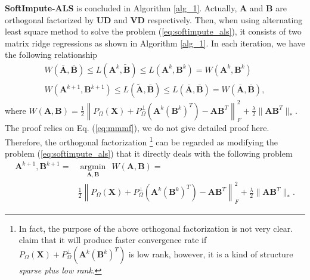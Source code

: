 \documentclass[11pt]{article}
\begin{document}
\textbf{SoftImpute-ALS} is concluded in Algorithm \ref{alg_1}. Actually,  $\boldsymbol{A}$ and $\boldsymbol{B}$ are orthogonal factorized by $\boldsymbol{U}\boldsymbol{D}$ and $\boldsymbol{V}\boldsymbol{D}$ respectively. Then, when using  alternating least square method to solve the problem (\ref{eq:softimpute_als}), it consists of two matrix ridge regressions as shown in Algorithm \ref{alg_1}. In each iteration, we have the following relationship
\begin{equation}
	\begin{split}
	W(\bar{\boldsymbol{A}},\bar{\boldsymbol{B}})\leq L(\boldsymbol{A}^k,\tilde{\boldsymbol{B}}) \leq L(\boldsymbol{A}^k,\boldsymbol{B}^k)=W(\boldsymbol{A}^k,\boldsymbol{B}^k) \\
	W(\boldsymbol{A}^{k+1},\boldsymbol{B}^{k+1})\leq	L(\tilde{\boldsymbol{A}},\bar{\boldsymbol{B}})\leq L(\bar{\boldsymbol{A}},\bar{\boldsymbol{B}}) =W(\bar{\boldsymbol{A}},\bar{\boldsymbol{B}}),
	\end{split}
\end{equation}
where $W(\boldsymbol{A},\boldsymbol{B}) =\frac{1}{2}\left\|P_{\Omega}(\boldsymbol{X})+P_{\Omega}^{\perp}(\boldsymbol{A}^k(\boldsymbol{B}^k)^T)-\boldsymbol{AB}^T\right\|_{F}^{2}+\frac{\lambda}{2}\|\boldsymbol{AB}^T\|_{*} $. The proof relies on Eq. (\ref{eq:mmmf}), we do not give detailed proof here. Therefore, the orthogonal factorization \footnote{In fact, the purpose of the above orthogonal factorization is not very clear. \cite{panagoda2021convergence} claim that it will produce faster convergence rate if $P_{\Omega}(\boldsymbol{X})+P_{\Omega}^{\perp}(\boldsymbol{A}^k(\boldsymbol{B}^k)^T)$ is low rank, however, it is a kind of structure \textit{sparse plus low rank}.} can be regarded as modifying the problem (\ref{eq:softimpute_als}) that it directly deals with the following problem
\begin{equation}
	\begin{split}
		\boldsymbol{A}^{k+1},\boldsymbol{B}^{k+1} =&\underset{\boldsymbol{A},\boldsymbol{B}}{\operatorname{argmin}} \ \ W(\boldsymbol{A},\boldsymbol{B})=\\ &\frac{1}{2}\left\|P_{\Omega}(\boldsymbol{X})+P_{\Omega}^{\perp}(\boldsymbol{A}^k(\boldsymbol{B}^k)^T)-\boldsymbol{AB}^T\right\|_{F}^{2}+\frac{\lambda}{2}\|\boldsymbol{AB}^T\|_{*}.
		\label{eq:softimpute_als_orth}
	\end{split}
\end{equation}
	
\end{document}
